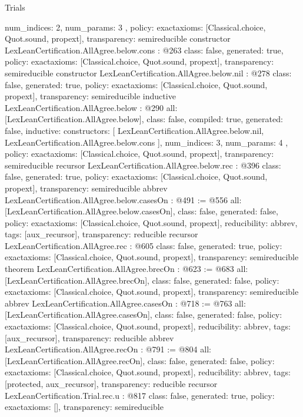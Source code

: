 \begin{lexlean}{Trials}
\begin{coremodule}
{{    num_indices: 2,
    num_params: 3
  },
  policy: exact{axioms: [Classical.choice, Quot.sound, propext]},
  transparency: semireducible
}
constructor LexLeanCertification.AllAgree.below.cons : @263 {
  class: false,
  generated: true,
  policy: exact{axioms: [Classical.choice, Quot.sound, propext]},
  transparency: semireducible
}
constructor LexLeanCertification.AllAgree.below.nil : @278 {
  class: false,
  generated: true,
  policy: exact{axioms: [Classical.choice, Quot.sound, propext]},
  transparency: semireducible
}
inductive LexLeanCertification.AllAgree.below : @290 {
  all: [LexLeanCertification.AllAgree.below],
  class: false,
  compiled: true,
  generated: false,
  inductive: {
    constructors: [
      LexLeanCertification.AllAgree.below.nil,
      LexLeanCertification.AllAgree.below.cons
    ],
    num_indices: 3,
    num_params: 4
  },
  policy: exact{axioms: [Classical.choice, Quot.sound, propext]},
  transparency: semireducible
}
recursor LexLeanCertification.AllAgree.below.rec : @396 {
  class: false,
  generated: true,
  policy: exact{axioms: [Classical.choice, Quot.sound, propext]},
  transparency: semireducible
}
abbrev LexLeanCertification.AllAgree.below.casesOn : @491 := @556 {
  all: [LexLeanCertification.AllAgree.below.casesOn],
  class: false,
  generated: false,
  policy: exact{axioms: [Classical.choice, Quot.sound, propext]},
  reducibility: abbrev{},
  tags: [aux_recursor],
  transparency: reducible
}
recursor LexLeanCertification.AllAgree.rec : @605 {
  class: false,
  generated: true,
  policy: exact{axioms: [Classical.choice, Quot.sound, propext]},
  transparency: semireducible
}
theorem LexLeanCertification.AllAgree.brecOn : @623 := @683 {
  all: [LexLeanCertification.AllAgree.brecOn],
  class: false,
  generated: false,
  policy: exact{axioms: [Classical.choice, Quot.sound, propext]},
  transparency: semireducible
}
abbrev LexLeanCertification.AllAgree.casesOn : @718 := @763 {
  all: [LexLeanCertification.AllAgree.casesOn],
  class: false,
  generated: false,
  policy: exact{axioms: [Classical.choice, Quot.sound, propext]},
  reducibility: abbrev{},
  tags: [aux_recursor],
  transparency: reducible
}
abbrev LexLeanCertification.AllAgree.recOn : @791 := @804 {
  all: [LexLeanCertification.AllAgree.recOn],
  class: false,
  generated: false,
  policy: exact{axioms: [Classical.choice, Quot.sound, propext]},
  reducibility: abbrev{},
  tags: [protected, aux_recursor],
  transparency: reducible
}
recursor LexLeanCertification.Trial.rec.{u} : @817 {
  class: false,
  generated: true,
  policy: exact{axioms: []},
  transparency: semireducible
}
\end{coremodule}
\end{lexlean}
